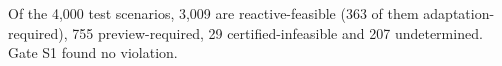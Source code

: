Of the 4,000 test scenarios, 3,009 are reactive-feasible (363 of them adaptation-required), 755 preview-required, 29 certified-infeasible and 207 undetermined. Gate S1 found no violation.
